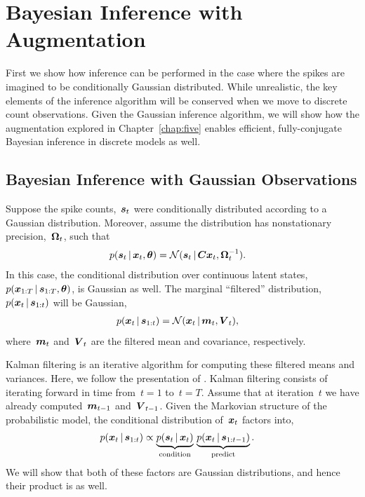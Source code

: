\section{Bayesian Inference with \polyagamma Augmentation}

First we show how inference can be performed in the case where
the spikes are imagined to be conditionally Gaussian distributed.
While unrealistic, the key elements of the inference algorithm
will be conserved when we move to discrete count observations.
Given the Gaussian inference algorithm, we will show how the \polyagamma
augmentation explored in Chapter~\ref{chap:five} enables efficient,
fully-conjugate Bayesian inference in discrete models as well.


\subsection{Bayesian Inference with Gaussian Observations}
Suppose the spike counts,~$\boldsymbol{s}_t$ were conditionally distributed
according to a Gaussian distribution. Moreover, assume the
distribution has nonstationary precision,~$\boldsymbol{\Omega}_t$, such that
\begin{align}
  \label{eq:gauss_lkhd}
  p(\boldsymbol{s}_t \,|\, \boldsymbol{x}_t, \boldsymbol{\theta}) 
  &=
  \mathcal{N}(\boldsymbol{s}_t \,|\, \boldsymbol{C} \boldsymbol{x}_t, \boldsymbol{\Omega}_t^{-1}).
\end{align}
In this case, the conditional distribution over continuous latent
states,~$p(\boldsymbol{x}_{1:T} \,|\, \boldsymbol{s}_{1:T}, \boldsymbol{\theta})$, is Gaussian as well.
The marginal ``filtered'' distribution,~${p(\boldsymbol{x}_t \,|\,
  \boldsymbol{s}_{1:t})}$ will be Gaussian,
\begin{align*}
  p(\boldsymbol{x}_t \,|\, \boldsymbol{s}_{1:t}) &= \mathcal{N}(\boldsymbol{x}_t \,|\, \boldsymbol{m}_t, \boldsymbol{V}_t),
\end{align*}
where~$\boldsymbol{m}_t$ and~$\boldsymbol{V}_t$ are the filtered mean and covariance, respectively.

Kalman filtering is an iterative algorithm for computing these filtered means 
and variances. 
Here, we follow the presentation of
\citet[Chapter 18]{murphy2012probabilistic}.  Kalman filtering consists
of iterating forward in time from~${t=1}$ to~${t=T}$. Assume that at iteration~$t$ we
have already computed~$\boldsymbol{m}_{t-1}$ and~$\boldsymbol{V}_{t-1}$. Given the
Markovian structure of the probabilistic model, the
conditional distribution of~$\boldsymbol{x}_t$ factors into,
\begin{align*}
  p(\boldsymbol{x}_t \,|\, \boldsymbol{s}_{1:t})
  &\propto
  \underbrace{p(\boldsymbol{s}_t \,|\, \boldsymbol{x}_t)}_{\text{condition}} \,
  \underbrace{p(\boldsymbol{x}_{t} \,|\, \boldsymbol{s}_{1:t-1})}_{\text{predict}}.
\end{align*}
We will show that both of these factors are Gaussian distributions, 
and hence their product is as well. 

